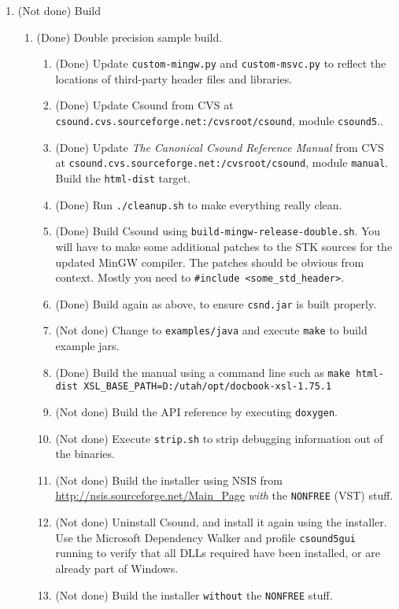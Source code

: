 \documentclass[11pt,letterpaper,onecolumn]{scrartcl}
\begin{document}
\begin{sloppypar}
\begin{enumerate}
\begin{enumerate}
 		\end{enumerate}
	\item (Not done) Build   
		\begin{enumerate}				
			\item (Done) Double precision sample build.
				\begin{enumerate}
		    	\item (Done) Update \texttt{custom-mingw.py} and \texttt{custom-msvc.py} to reflect the locations of third-party header files and libraries.
					\item (Done) Update Csound from CVS at \verb|csound.cvs.sourceforge.net:/cvsroot/csound|, module \texttt{csound5}..
					\item (Done) Update \emph{The Canonical Csound Reference Manual} from CVS at \verb|csound.cvs.sourceforge.net:/cvsroot/csound|, module \texttt{manual}. Build the \texttt{html-dist} target.
					\item (Done) Run \texttt{./cleanup.sh} to make everything really clean.
			    \item (Done) Build Csound using \texttt{build-mingw-release-double.sh}. You will have to make some additional patches to the STK sources for the updated MinGW compiler. The patches should be obvious from context. Mostly you need to \verb|#include <some_std_header>|.
			    \item (Done) Build again as above, to ensure \texttt{csnd.jar} is built properly.
			    \item (Not done) Change to \texttt{examples/java} and execute \texttt{make} to build example jars.
			    \item (Done) Build the manual using a command line such as \verb|make html-dist XSL_BASE_PATH=D:/utah/opt/docbook-xsl-1.75.1|
			    \item (Not done) Build the API reference by executing \texttt{doxygen}.
			    \item (Not done) Execute \texttt{strip.sh} to strip debugging information out of the binaries.
			    \item (Not done) Build the installer using NSIS from \url{http://nsis.sourceforge.net/Main_Page} \emph{with} the \verb|NONFREE| (VST) stuff.  
			    \item (Not done) Uninstall Csound, and install it again using the installer. Use the Microsoft Dependency Walker and profile \texttt{csound5gui} running to verify that all DLLs required have been installed, or are already part of Windows.
			    \item (Not done) Build the installer \texttt{without} the \verb|NONFREE| stuff.   

\end{enumerate}
\end{enumerate}
\end{enumerate}
\end{sloppypar}
\end{document}
